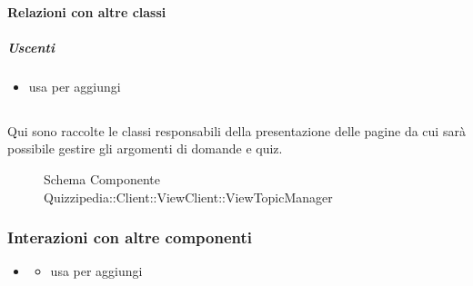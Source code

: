 \paragraph{Relazioni con altre classi}
\subparagraph{Uscenti}
\begin{itemize}
\item usa  per aggiungi
\end{itemize}
\subsection{}
Qui sono raccolte le classi responsabili della presentazione delle pagine da cui sarà possibile gestire gli argomenti di domande e quiz.
\begin{figure}[H]
\centering
\noindent{}
\caption[Schema Componente Quizzipedia::Client::ViewClient::ViewTopicManager]{Schema Componente Quizzipedia::Client::ViewClient::ViewTopicManager}
\end{figure}
\subsubsection{Interazioni con altre componenti}
\begin{itemize}
\item {}
\begin{itemize}
\item usa  per aggiungi
\end{itemize}
\end{itemize}
